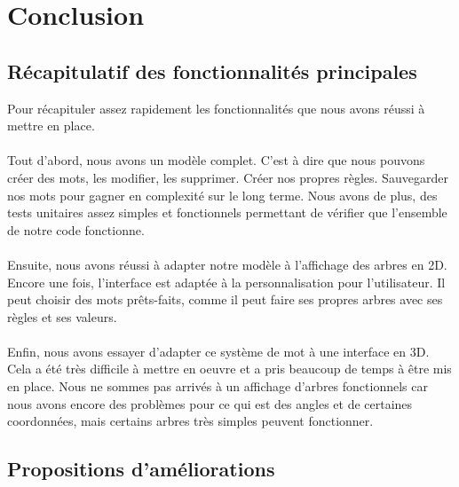 \documentclass[a4paper,12pt]{article}
\begin{document}
\section{Conclusion}

\subsection{Récapitulatif des fonctionnalités principales}

Pour récapituler assez rapidement les fonctionnalités que nous avons réussi à mettre en place.
\\\\
Tout d'abord, nous avons un modèle complet. C'est à dire que nous pouvons créer des mots, les modifier, les supprimer. Créer nos propres règles. Sauvegarder nos mots pour gagner en complexité sur le long terme. Nous avons de plus, des tests unitaires assez simples et fonctionnels permettant de vérifier que l'ensemble de notre code fonctionne. 
\\\\ 
Ensuite, nous avons réussi à adapter notre modèle à l'affichage des arbres en 2D. Encore une fois, l'interface est adaptée à la personnalisation pour l'utilisateur. Il peut choisir des mots prêts-faits, comme il peut faire ses propres arbres avec ses règles et ses valeurs. 
\\\\
Enfin, nous avons essayer d'adapter ce système de mot à une interface en 3D. Cela a été très difficile à mettre en oeuvre et a pris beaucoup de temps à être mis en place. Nous ne sommes pas arrivés à un affichage d'arbres fonctionnels car nous avons encore des problèmes pour ce qui est des angles et de certaines coordonnées, mais certains arbres très simples peuvent fonctionner.

\subsection{Propositions d'améliorations}
\end{document}
